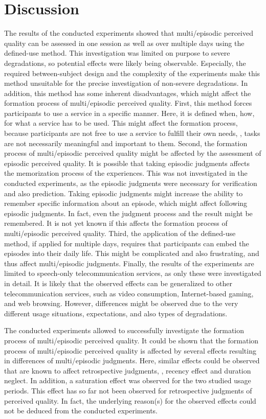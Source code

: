 \section{Discussion}
The results of the conducted experiments showed that multi\-/episodic perceived quality can be assessed in one session as well as over multiple days using the defined-use method.
This investigation was limited on purpose to severe degradations, so potential effects were likely being observable.
Especially, the required between-subject design and the complexity of the experiments make this method unsuitable for the precise investigation of non-severe degradations.
In addition, this method has some inherent disadvantages, which might affect the formation process of multi\-/episodic perceived quality.
First, this method forces participants to use a service in a specific manner.
Here, it is defined when, how, for what a service has to be used.
This might affect the formation process, because participants are not free to use a service to fulfill their own needs, \ie, tasks are not necessarily meaningful and important to them.
Second, the formation process of multi\-/episodic perceived quality might be affected by the assessment of episodic perceived quality.
It is possible that taking episodic judgments affects the memorization process of the experiences.
This was not investigated in the conducted experiments, as the episodic judgments were necessary for verification and also prediction.
Taking episodic judgments might increase the ability to remember specific information about an episode, which might affect following episodic judgments.
In fact, even the judgment process and the result might be remembered.
It is not yet known if this affects the formation process of multi\-/episodic perceived quality.
Third, the application of the defined-use method, if applied for multiple days, requires that participants can embed the episodes into their daily life.
This might be complicated and also frustrating, and thus affect multi\-/episodic judgments.
Finally, the results of the experiments are limited to speech-only telecommunication services, as only these were investigated in detail.
It is likely that the observed effects can be generalized to other telecommunication services, such as video consumption, Internet-based gaming, and web browsing.
However, differences might be observed due to the very different usage situations, expectations, and also types of degradations.

The conducted experiments allowed to successfully investigate the formation process of multi\-/episodic perceived quality.
It could be shown that the formation process of multi\-/episodic perceived quality is affected by several effects resulting in differences of multi\-/episodic judgments.
Here, similar effects could be observed that are known to affect retrospective judgments, \ie, recency effect and duration neglect.
In addition, a saturation effect was observed for the two studied usage periods.
This effect has so far not been observed for retrospective judgments of perceived quality.
In fact, the underlying reason(s) for the observed effects could not be deduced from the conducted experiments.

